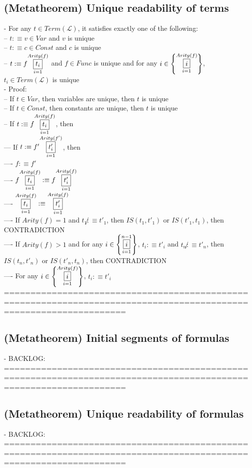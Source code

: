 \documentclass{book}
\newcommand{\is}{:\equiv}
\newcommand{\inot}{\not}
\newcommand{\set}[1]{\left\{ #1 \right\}}
\newcommand{\vdc}[3]{\underset{#2}{\overset{#3}{\fbox{$#1$}}}}
\begin{document}
\subsection{(Metatheorem) Unique readability of terms} %
	- For any $t \in Term(\mathcal{L})$, it satisfies exactly one of the following: \\
		-- $t \is v \in Var$ and $v$ is unique \\
		-- $t \is c \in Const$ and $c$ is unique \\
		-- $t \is f \vdc{t_i}{i=1}{Arity(f)}$ and $f \in Func$ is unique and for any $i \in \set{\vdc{i}{i=1}{Arity(f)}}$, $t_i \in Term(\mathcal{L})$ is unique \\ 
	- Proof: \\
		-- If $t \in Var$, then variables are unique, then $t$ is unique \\
		-- If $t \in Const$, then constants are unique, then $t$ is unique \\
		-- If $t \is f \vdc{t_i}{i=1}{Arity(f)}$, then \\
			--- If $t \is f' \vdc{t'_i}{i=1}{Arity(f')}$, then \\
				---- $f \is f'$ \\
				---- $f \vdc{t_i}{i=1}{Arity(f)} \is f \vdc{t'_i}{i=1}{Arity(f)}$ \\
				---- $\vdc{t_i}{i=1}{Arity(f)} \is \vdc{t'_i}{i=1}{Arity(f)}$ \\
				---- If $Arity(f) = 1$ and $t_1 \inot \is t'_1$, then $IS(t_1, t'_1)$ or $IS(t'_1, t_1)$, then CONTRADICTION \\
				---- If $Arity(f) > 1$ and for any $i \in \set{\vdc{i}{i=1}{n-1}}$, $t_i \is t'_i$ and $t_n \inot \is t'_n$, then $IS(t_n, t'_n)$ or $IS(t'_n, t_n)$, then CONTRADICTION \\
				---- For any $i \in \set{\vdc{i}{i=1}{Arity(f)}}$, $t_i \is t'_i$ \\
	===================================================================================================================
\subsection{(Metatheorem) Initial segments of formulas} %
	- BACKLOG: \\
	===================================================================================================================
\subsection{(Metatheorem) Unique readability of formulas} %
	- BACKLOG:  \\
	===================================================================================================================
\end{document}
